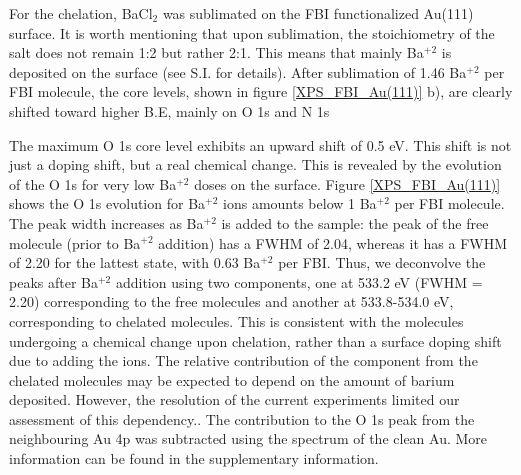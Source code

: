 \documentclass[aps,prl,reprint,longbibliography,superscriptaddress]{revtex4-1}
\def\BaCl{BaCl$_2$ }
\def\Ba{Ba$^{+2}$ }
\newcommand{\completar}[1]{{\color{red} #1}}
\begin{document}
For the chelation, \BaCl was sublimated on the FBI functionalized Au(111) surface. It is worth mentioning that upon sublimation, the stoichiometry of the salt does not remain 1:2 but rather 2:1. This means that mainly \Ba is deposited on the surface (see S.I. for details).
After sublimation of 1.46 \Ba per FBI molecule, the core levels, shown in figure \ref{XPS_FBI_Au(111)} b), are clearly shifted toward higher B.E, mainly on O 1s and N 1s

The maximum O 1s core level exhibits an upward shift of 0.5 eV. This shift is not just a doping shift, but a real chemical change. This is revealed by the evolution of the O 1s for very low \Ba doses on the surface. Figure \ref{XPS_FBI_Au(111)} shows the O 1s evolution for \Ba ions amounts below 1 \Ba per FBI molecule. The peak width increases as \Ba is added to the sample: the peak of the free molecule (prior to \Ba addition) has a FWHM of 2.04, whereas it has a FWHM of 2.20 for the lattest state, with 0.63 \Ba per FBI. Thus, we deconvolve the peaks after \Ba addition using two components, one at 533.2 eV (FWHM = 2.20) corresponding to the free molecules and another at 533.8-534.0 eV, corresponding to chelated molecules.   This is consistent with the molecules undergoing a chemical change upon chelation, rather than a surface doping shift due to adding the ions. \completar{The relative contribution of the component from the chelated molecules may be expected to depend on the amount of barium deposited. However, the resolution of the current experiments limited our assessment of this dependency.}. The contribution to the O 1s peak from the neighbouring Au 4p was subtracted using the spectrum of the clean Au. More information can be found in the supplementary information.
\end{document}
